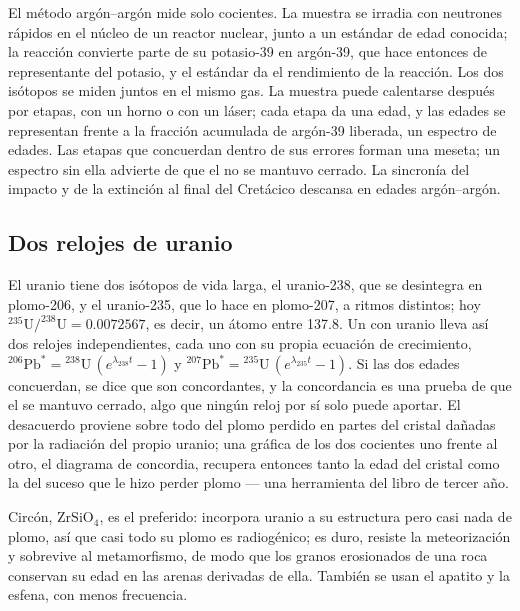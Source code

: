 El método argón--argón mide solo cocientes. La muestra se irradia con neutrones rápidos en el núcleo de un reactor nuclear, junto a un  estándar de edad conocida; la reacción convierte parte de su potasio-39 en argón-39, que hace entonces de representante del potasio, y el estándar da el rendimiento de la reacción. Los dos isótopos se miden juntos en el mismo gas. La muestra puede calentarse después por etapas, con un horno o con un láser; cada etapa da una edad, y las edades se representan frente a la fracción acumulada de argón-39 liberada, un espectro de edades. Las etapas que concuerdan dentro de sus errores forman una meseta; un espectro sin ella advierte de que el  no se mantuvo cerrado. La sincronía del impacto y de la extinción al final del Cretácico descansa en edades argón--argón.

\subsection*{Dos relojes de uranio}

El uranio tiene dos isótopos de vida larga, el uranio-238, que se desintegra en plomo-206, y el uranio-235, que lo hace en plomo-207, a ritmos distintos; hoy
$^{235}\mathrm{U}/^{238}\mathrm{U} = 0.0072567$, es decir, un átomo entre 137.8. Un  con uranio lleva así dos relojes independientes, cada uno con su propia
ecuación de crecimiento, ${}^{206}\mathrm{Pb}^* = {}^{238}\mathrm{U}\,(e^{\lambda_{238} t} - 1)$
y ${}^{207}\mathrm{Pb}^* = {}^{235}\mathrm{U}\,(e^{\lambda_{235} t} - 1)$. Si las dos edades concuerdan, se dice que son concordantes, y la concordancia es una prueba de que el  se mantuvo cerrado, algo que ningún reloj por sí solo puede aportar. El desacuerdo proviene sobre todo del plomo perdido en partes del cristal dañadas por la radiación
del propio uranio; una gráfica de los dos cocientes uno frente al otro, el diagrama de concordia, recupera entonces tanto la edad del cristal como la del suceso que le hizo perder plomo --- una herramienta del libro de tercer año.

Circón, $\mathrm{ZrSiO_4}$, es el  preferido: incorpora uranio a su estructura pero casi nada de plomo, así que casi todo su plomo es radiogénico; es duro, resiste la meteorización y sobrevive al metamorfismo, de modo que los granos erosionados de una roca conservan su edad en las arenas derivadas de ella. También se usan el apatito y la esfena, con menos frecuencia.

